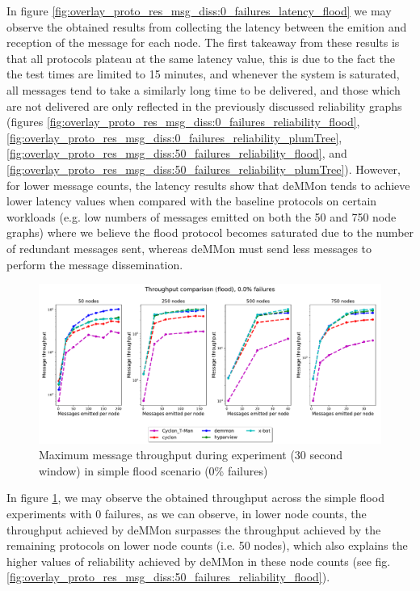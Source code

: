 In figure \ref{fig:overlay_proto_res_msg_diss:0_failures_latency_flood} we may observe the obtained results from collecting the latency between the emition and reception of the message for each node. The first takeaway from these results is that all protocols plateau at the same latency value, this is due to the fact the the test times are limited to 15 minutes, and whenever the system is saturated, all messages tend to take a similarly long time to be delivered, and those which are not delivered are only reflected in the previously discussed reliability graphs (figures \ref{fig:overlay_proto_res_msg_diss:0_failures_reliability_flood}, \ref{fig:overlay_proto_res_msg_diss:0_failures_reliability_plumTree}, \ref{fig:overlay_proto_res_msg_diss:50_failures_reliability_flood}, and \ref{fig:overlay_proto_res_msg_diss:50_failures_reliability_plumTree}). However, for lower message counts, the latency results show that deMMon tends to achieve lower latency values when compared with the baseline protocols on certain workloads (e.g. low numbers of messages emitted on both the 50 and 750 node graphs) where we believe the flood protocol becomes saturated due to the number of redundant messages sent, whereas deMMon must send less messages to perform the message dissemination.

\begin{figure}[htbp]
    \centering
    \includegraphics[width=\linewidth]{Chapters/evaluation/figures/flood/flood_0.0_failures_throughput.pdf}
    \caption{Maximum message throughput during experiment (30 second window) in simple flood scenario (0\% failures)}
    \label{fig:overlay_proto_res_msg_diss:0_failures_throughput_flood}
\end{figure}

In figure \ref{fig:overlay_proto_res_msg_diss:0_failures_throughput_flood}, we may observe the obtained throughput across the simple flood experiments with 0 failures, as we can observe, in lower node counts, the throughput achieved by deMMon surpasses the throughput achieved by the remaining protocols on lower node counts (i.e. 50 nodes), which also explains the higher values of reliability achieved by deMMon in these node counts (see fig. \ref{fig:overlay_proto_res_msg_diss:50_failures_reliability_flood}).


